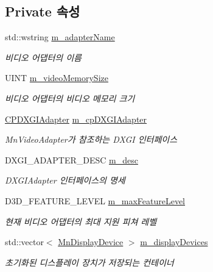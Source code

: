 \subsection*{Private 속성}
\begin{DoxyCompactItemize}
\item 
std\+::wstring \hyperlink{class_m_n_l_1_1_mn_video_adapter_a9c2e2e0b3a53a9fe378aa56b7017c2f5}{m\+\_\+adapter\+Name}
\begin{DoxyCompactList}\small\item\em 비디오 어댑터의 이름 \end{DoxyCompactList}\item 
U\+I\+NT \hyperlink{class_m_n_l_1_1_mn_video_adapter_a3b36c9861c046a731ca8ad1f90c8620b}{m\+\_\+video\+Memory\+Size}
\begin{DoxyCompactList}\small\item\em 비디오 어댑터의 비디오 메모리 크기 \end{DoxyCompactList}\item 
\hyperlink{namespace_m_n_l_ab0e24805043a50c45364c389f8929f33}{C\+P\+D\+X\+G\+I\+Adapter} \hyperlink{class_m_n_l_1_1_mn_video_adapter_ae743c79f46ca0fc26eaef14efe19a0b9}{m\+\_\+cp\+D\+X\+G\+I\+Adapter}
\begin{DoxyCompactList}\small\item\em Mn\+Video\+Adapter가 참조하는 D\+X\+GI 인터페이스 \end{DoxyCompactList}\item 
D\+X\+G\+I\+\_\+\+A\+D\+A\+P\+T\+E\+R\+\_\+\+D\+E\+SC \hyperlink{class_m_n_l_1_1_mn_video_adapter_a4417d4ff3cc18acd724176def494b056}{m\+\_\+desc}
\begin{DoxyCompactList}\small\item\em D\+X\+G\+I\+Adapter 인터페이스의 명세 \end{DoxyCompactList}\item 
D3\+D\+\_\+\+F\+E\+A\+T\+U\+R\+E\+\_\+\+L\+E\+V\+EL \hyperlink{class_m_n_l_1_1_mn_video_adapter_abcbb7aa451a1759d3543ef6d55660f09}{m\+\_\+max\+Feature\+Level}
\begin{DoxyCompactList}\small\item\em 현재 비디오 어댑터의 최대 지원 피쳐 레벨 \end{DoxyCompactList}\item 
std\+::vector$<$ \hyperlink{class_m_n_l_1_1_mn_display_device}{Mn\+Display\+Device} $>$ \hyperlink{class_m_n_l_1_1_mn_video_adapter_a22f14cd6301e97c7a7919f6b65b8978b}{m\+\_\+display\+Devices}
\begin{DoxyCompactList}\small\item\em 초기화된 디스플레이 장치가 저장되는 컨테이너 \end{DoxyCompactList}\end{DoxyCompactItemize}


